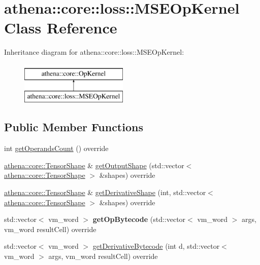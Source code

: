 \hypertarget{classathena_1_1core_1_1loss_1_1_m_s_e_op_kernel}{}\section{athena\+:\+:core\+:\+:loss\+:\+:M\+S\+E\+Op\+Kernel Class Reference}
\label{classathena_1_1core_1_1loss_1_1_m_s_e_op_kernel}
Inheritance diagram for athena\+:\+:core\+:\+:loss\+:\+:M\+S\+E\+Op\+Kernel\+:\begin{figure}[H]
\begin{center}
\leavevmode
\includegraphics[height=2.000000cm]{df/d1d/classathena_1_1core_1_1loss_1_1_m_s_e_op_kernel}
\end{center}
\end{figure}
\subsection*{Public Member Functions}
\begin{DoxyCompactItemize}
\item 
int \mbox{\hyperlink{classathena_1_1core_1_1loss_1_1_m_s_e_op_kernel_ab851ee62ea95c3aab8aab2d28cfa9d04}{get\+Operands\+Count}} () override
\item 
\mbox{\hyperlink{classathena_1_1core_1_1_tensor_shape}{athena\+::core\+::\+Tensor\+Shape}} \& \mbox{\hyperlink{classathena_1_1core_1_1loss_1_1_m_s_e_op_kernel_a23aacffbbc73b177535511702f3c441d}{get\+Output\+Shape}} (std\+::vector$<$ \mbox{\hyperlink{classathena_1_1core_1_1_tensor_shape}{athena\+::core\+::\+Tensor\+Shape}} $>$ \&shapes) override
\item 
\mbox{\hyperlink{classathena_1_1core_1_1_tensor_shape}{athena\+::core\+::\+Tensor\+Shape}} \& \mbox{\hyperlink{classathena_1_1core_1_1loss_1_1_m_s_e_op_kernel_a68a0220e3a3591638c7725b5cb659609}{get\+Derivative\+Shape}} (int, std\+::vector$<$ \mbox{\hyperlink{classathena_1_1core_1_1_tensor_shape}{athena\+::core\+::\+Tensor\+Shape}} $>$ \&shapes) override
\item 
\mbox{\label{classathena_1_1core_1_1loss_1_1_m_s_e_op_kernel_a92d3c2ca58c2a67df6dbf623c5d1ce65}} 
std\+::vector$<$ vm\+\_\+word $>$ {\bfseries get\+Op\+Bytecode} (std\+::vector$<$ vm\+\_\+word $>$ args, vm\+\_\+word result\+Cell) override
\item 
std\+::vector$<$ vm\+\_\+word $>$ \mbox{\hyperlink{classathena_1_1core_1_1loss_1_1_m_s_e_op_kernel_a936002563d3ef3a029bbeecbdbd3a509}{get\+Derivative\+Bytecode}} (int d, std\+::vector$<$ vm\+\_\+word $>$ args, vm\+\_\+word result\+Cell) override
\end{DoxyCompactItemize}
